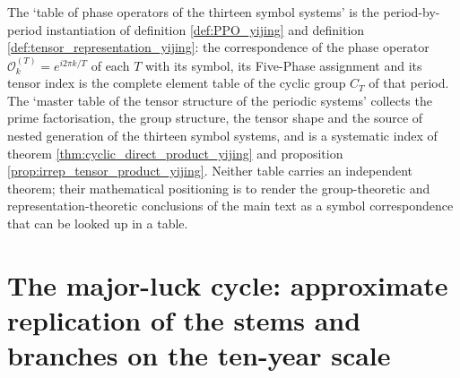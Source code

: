 \begin{remark}
The `table of phase operators of the thirteen symbol systems' is the period-by-period instantiation of definition \ref{def:PPO_yijing} and definition \ref{def:tensor_representation_yijing}: the correspondence of the phase operator $\mathcal{O}_k^{(T)} = e^{i2\pi k/T}$ of each $T$ with its symbol, its Five-Phase assignment and its tensor index is the complete element table of the cyclic group $C_T$ of that period. The `master table of the tensor structure of the periodic systems' collects the prime factorisation, the group structure, the tensor shape and the source of nested generation of the thirteen symbol systems, and is a systematic index of theorem \ref{thm:cyclic_direct_product_yijing} and proposition \ref{prop:irrep_tensor_product_yijing}. Neither table carries an independent theorem; their mathematical positioning is to render the group-theoretic and representation-theoretic conclusions of the main text as a symbol correspondence that can be looked up in a table.
\end{remark}

\section{The major-luck cycle: approximate replication of the stems and branches on the ten-year scale}
\label{sec:dayun_yijing}

